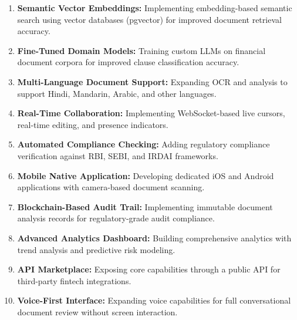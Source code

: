 \documentclass[12pt,a4paper,oneside]{report}
\begin{document}
\begin{enumerate}[leftmargin=2cm]
  \item \textbf{Semantic Vector Embeddings:} Implementing embedding-based semantic search using vector databases (pgvector) for improved document retrieval accuracy.
  \item \textbf{Fine-Tuned Domain Models:} Training custom LLMs on financial document corpora for improved clause classification accuracy.
  \item \textbf{Multi-Language Document Support:} Expanding OCR and analysis to support Hindi, Mandarin, Arabic, and other languages.
  \item \textbf{Real-Time Collaboration:} Implementing WebSocket-based live cursors, real-time editing, and presence indicators.
  \item \textbf{Automated Compliance Checking:} Adding regulatory compliance verification against RBI, SEBI, and IRDAI frameworks.
  \item \textbf{Mobile Native Application:} Developing dedicated iOS and Android applications with camera-based document scanning.
  \item \textbf{Blockchain-Based Audit Trail:} Implementing immutable document analysis records for regulatory-grade audit compliance.
  \item \textbf{Advanced Analytics Dashboard:} Building comprehensive analytics with trend analysis and predictive risk modeling.
  \item \textbf{API Marketplace:} Exposing core capabilities through a public API for third-party fintech integrations.
  \item \textbf{Voice-First Interface:} Expanding voice capabilities for full conversational document review without screen interaction.
\end{enumerate}
\end{document}
